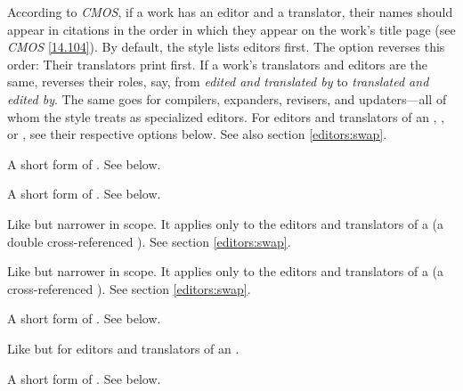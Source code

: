 \documentclass[11pt,letterpaper,oneside]{article}
\begin{document}
\begin{optionlist}

\noindent According to \textit{CMOS}, if a work has an editor and a
translator, their names should appear in citations in the order in
which they appear on the work's title page (see \textit{CMOS}
\ref{14.104}). By default, the style lists editors first. The option
 reverses this order: Their translators print
first. If a work's translators and editors are the same,
 reverses their roles, say, from \textit{edited
and translated by} to \textit{translated and edited by}. The same goes
for compilers, expanders, revisers, and updaters---all of whom the
style treats as specialized editors. For editors and translators of an
, , or , see
their respective options below. See also section \ref{editors:swap}.


A short form of . See below.


A short form of . See below.


Like  but narrower in scope. It applies only to the
editors and translators of a  (a double
cross-referenced ). See section \ref{editors:swap}.


Like  but narrower in scope. It applies only to the
editors and translators of a  (a cross-referenced
). See section \ref{editors:swap}.


A short form of . See below.


Like  but for editors and translators of an
.


A short form of . See below.


\end{optionlist}
\end{document}

